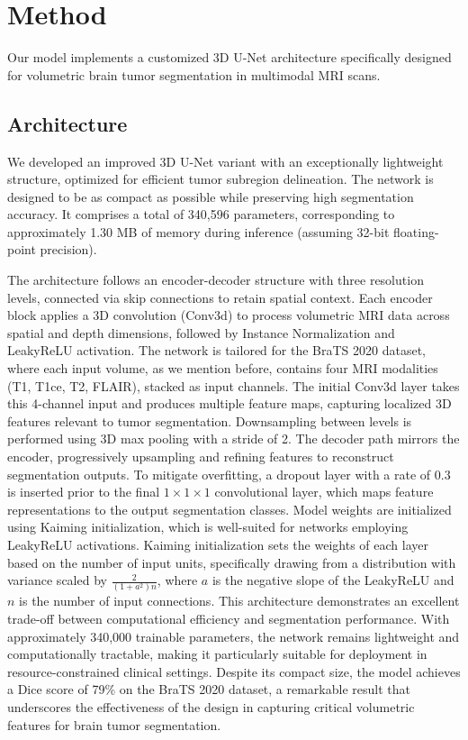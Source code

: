 \documentclass[10pt,twocolumn,letterpaper]{article}
\begin{document}
\section{Method}
Our model implements a customized 3D U-Net architecture specifically designed for volumetric brain tumor segmentation in multimodal MRI scans.

\subsection{Architecture} \label{Architecture}
We developed an improved 3D U-Net variant with an exceptionally lightweight structure, optimized for efficient tumor subregion delineation. The network is designed to be as compact as possible while preserving high segmentation accuracy. It comprises a total of 340,596 parameters, corresponding to approximately 1.30 MB of memory during inference (assuming 32-bit floating-point precision).

The architecture follows an encoder-decoder structure with three resolution levels, 
connected via skip connections to retain spatial context. Each encoder block applies a 3D convolution (Conv3d) to process volumetric MRI data across spatial and depth dimensions, 
followed by Instance Normalization and LeakyReLU activation. 
The network is tailored for the BraTS 2020 dataset, where each input volume, as we mention before, contains four MRI modalities (T1, T1ce, T2, FLAIR), stacked as input channels. 
The initial Conv3d layer takes this 4-channel input and produces multiple feature maps, capturing localized 3D features relevant to tumor segmentation. 
Downsampling between levels is performed using 3D max pooling with a stride of 2. The decoder path mirrors the encoder, progressively upsampling and refining features to reconstruct segmentation outputs.
To mitigate overfitting, a dropout layer with a rate of $0.3$ is inserted prior to the final $1\times1\times1$ convolutional layer, which maps feature representations to the output segmentation classes. 
Model weights are initialized using Kaiming initialization, which is well-suited for networks employing LeakyReLU activations. 
Kaiming initialization \cite{He_2015_ICCV} sets the weights of each layer based on the number of input units, specifically drawing from a distribution with variance scaled by $\frac{2}{(1 + a^2)n}$, where $a$ is the negative slope of the LeakyReLU and $n$ is the number of input connections.  
This architecture demonstrates an excellent trade-off between computational efficiency and segmentation performance. With approximately 340,000 trainable parameters, the network remains lightweight and computationally tractable, making it particularly suitable for deployment in resource-constrained clinical settings. Despite its compact size, the model achieves a Dice score of 79\% on the BraTS 2020 dataset, a remarkable result that underscores the effectiveness of the design in capturing critical volumetric features for brain tumor segmentation.
\end{document}
